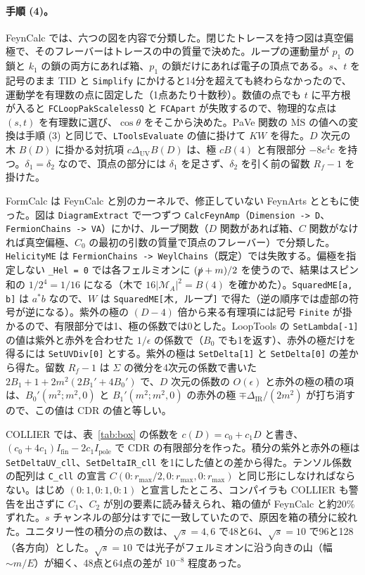 \documentclass[a4paper,10pt]{ltjsarticle}
\newcommand{\MSbar}{\overline{\mathrm{MS}}}
\newcommand{\DUV}{\Delta_{\mathrm{UV}}}
\newcommand{\DIR}{\Delta_{\mathrm{IR}}}
\begin{document}
\paragraph{手順 (4)。}FeynCalc では、六つの図を内容で分類した。閉じたトレースを持つ図は真空偏極で、そのフレーバーはトレースの中の質量で決めた。ループの運動量が $p_1$ の鎖と $k_1$ の鎖の両方にあれば箱、$p_1$ の鎖だけにあれば電子の頂点である。$s$、$t$ を記号のまま TID と \texttt{Simplify} にかけると14分を超えても終わらなかったので、運動学を有理数の点に固定した（1点あたり十数秒）。数値の点でも $t$ に平方根が入ると \texttt{FCLoopPakScalelessQ} と \texttt{FCApart} が失敗するので、物理的な点は $(s,t)$ を有理数に選び、$\cos\theta$ をそこから決めた。PaVe 関数の $\MSbar$ の値への変換は手順 (3) と同じで、\texttt{LToolsEvaluate} の値に掛けて $KW$ を得た。$D$ 次元の木 $B(D)$ に掛かる対抗項 $c\DUV B(D)$ は、極 $cB(4)$ と有限部分 $-8e^4c$ を持つ。$\delta_1=\delta_2$ なので、頂点の部分には $\delta_1$ を足さず、$\delta_2$ を引く前の留数 $R_f-1$ を掛けた。

FormCalc は FeynCalc と別のカーネルで、修正していない FeynArts とともに使った。図は \texttt{DiagramExtract} で一つずつ \texttt{CalcFeynAmp}（\texttt{Dimension -> D}、\texttt{FermionChains -> VA}）にかけ、ループ関数（$D$ 関数があれば箱、$C$ 関数がなければ真空偏極、$C_0$ の最初の引数の質量で頂点のフレーバー）で分類した。\texttt{HelicityME} は \texttt{FermionChains -> WeylChains}（既定）では失敗する。偏極を指定しない \texttt{\_Hel = 0} では各フェルミオンに $(\slashed p+m)/2$ を使うので、結果はスピン和の $1/2^4=1/16$ になる（木で $16|\mathcal M_A|^2=B(4)$ を確かめた）。\texttt{SquaredME[a, b]} は $a^*b$ なので、$W$ は \texttt{SquaredME[}木\texttt{, }ループ\texttt{]} で得た（逆の順序では虚部の符号が逆になる）。紫外の極の $(D-4)$ 倍から来る有理項には記号 \texttt{Finite} が掛かるので、有限部分では1、極の係数では0とした。LoopTools の \texttt{SetLambda[-1]} の値は紫外と赤外を合わせた $1/\epsilon$ の係数で（$B_0$ でも1を返す）、赤外の極だけを得るには \texttt{SetUVDiv[0]} とする。紫外の極は \texttt{SetDelta[1]} と \texttt{SetDelta[0]} の差から得た。留数 $R_f-1$ は $\Sigma$ の微分を4次元の係数で書いた $2B_1+1+2m^2(2B_1'+4B_0')$ で、$D$ 次元の係数の $O(\epsilon)$ と赤外の極の積の項は、$B_0'(m^2;m^2,0)$ と $B_1'(m^2;m^2,0)$ の赤外の極 $\mp\DIR/(2m^2)$ が打ち消すので、この値は CDR の値と等しい。

COLLIER では、表~\ref{tab:box} の係数を $c(D)=c_0+c_1D$ と書き、$(c_0+4c_1)I_{\mathrm{fin}}-2c_1I_{\mathrm{pole}}$ で CDR の有限部分を作った。積分の紫外と赤外の極は \texttt{SetDeltaUV\_cll}、\texttt{SetDeltaIR\_cll} を1にした値との差から得た。テンソル係数の配列は \texttt{C\_cll} の宣言 $C(0{:}r_{\max}/2,0{:}r_{\max},0{:}r_{\max})$ と同じ形にしなければならない。はじめ $(0{:}1,0{:}1,0{:}1)$ と宣言したところ、コンパイラも COLLIER も警告を出さずに $C_1$、$C_2$ が別の要素に読み替えられ、箱の値が FeynCalc と約20\%ずれた。$s$ チャンネルの部分はすでに一致していたので、原因を箱の積分に絞れた。ユニタリー性の積分の点の数は、$\sqrt s=4,6$ で48と64、$\sqrt s=10$ で96と128（各方向）とした。$\sqrt s=10$ では光子がフェルミオンに沿う向きの山（幅 $\sim m/E$）が細く、48点と64点の差が $10^{-8}$ 程度あった。
\end{document}
